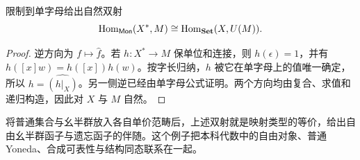 \begin{theorem}[自由幺半群的普遍性质]
限制到单字母给出自然双射
\[
\operatorname{Hom}_{\mathsf{Mon}}(X^*,M)\cong\operatorname{Hom}_{\mathbf{Set}}(X,U(M)).
\]
\end{theorem}
\begin{proof}
逆方向为 $f\mapsto\widehat f$。若 $h:X^*\to M$ 保单位和连接，则 $h(\epsilon)=1$，并有
$h([x]w)=h([x])h(w)$。按字长归纳，$h$ 被它在单字母上的值唯一确定，所以 $h=\widehat{(h|_X)}$。另一侧逆已经由单字母公式证明。两个方向均由复合、求值和递归构造，因此对 $X$ 与 $M$ 自然。
\end{proof}
\begin{remark}
将普通集合与幺半群放入各自单价范畴后，上述双射就是映射类型的等价，给出自由幺半群函子与遗忘函子的伴随。这个例子把本科代数中的自由对象、普通 Yoneda、合成可表性与结构同态联系在一起。
\end{remark}
